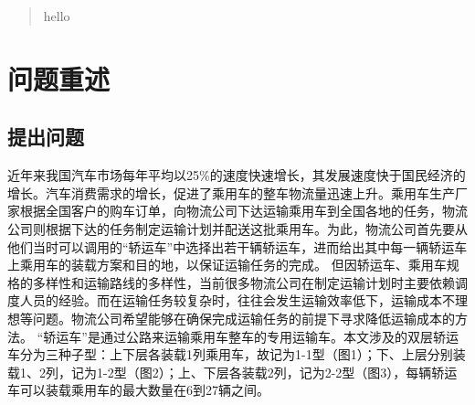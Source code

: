 \documentclass[UTF8]{ctexart}
\begin{document}

\begin{abstract}
hello
\end{abstract}

\section{问题重述}
\subsection{提出问题}
	近年来我国汽车市场每年平均以25\%的速度快速增长，其发展速度快于国民经济的增长。汽车消费需求的增长，促进了乘用车的整车物流量迅速上升。乘用车生产厂家根据全国客户的购车订单，向物流公司下达运输乘用车到全国各地的任务，物流公司则根据下达的任务制定运输计划并配送这批乘用车。为此，物流公司首先要从他们当时可以调用的“轿运车”中选择出若干辆轿运车，进而给出其中每一辆轿运车上乘用车的装载方案和目的地，以保证运输任务的完成。
但因轿运车、乘用车规格的多样性和运输路线的多样性，当前很多物流公司在制定运输计划时主要依赖调度人员的经验。而在运输任务较复杂时，往往会发生运输效率低下，运输成本不理想等问题。物流公司希望能够在确保完成运输任务的前提下寻求降低运输成本的方法。
“轿运车”是通过公路来运输乘用车整车的专用运输车。本文涉及的双层轿运车分为三种子型：上下层各装载1列乘用车，故记为1-1型（图1）；下、上层分别装载1、2列，记为1-2型（图2）；上、下层各装载2列，记为2-2型（图3），每辆轿运车可以装载乘用车的最大数量在6到27辆之间。
\end{document}
